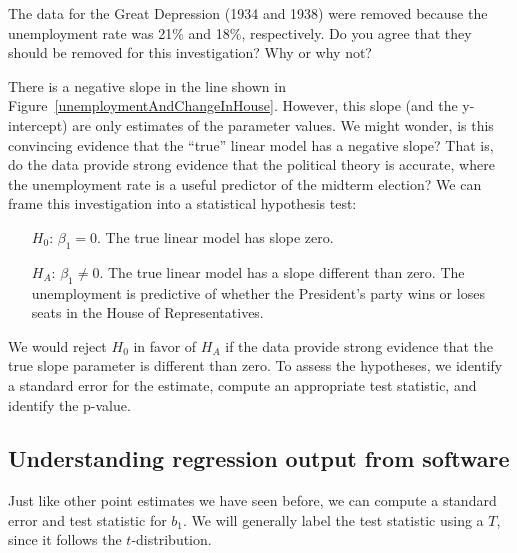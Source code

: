 \begin{exercisewrap}
\begin{nexercise}
The data for the Great Depression (1934 and 1938) were removed
because the unemployment rate was 21\% and 18\%, respectively.
Do you agree that they should be removed for this investigation?
Why or why not?\footnotemark{}
\end{nexercise}
\end{exercisewrap}

There is a negative slope in the line shown in
Figure~\ref{unemploymentAndChangeInHouse}.
However, this slope (and the y-intercept) are only estimates
of the parameter values.
We might wonder, is this convincing evidence that the ``true''
linear model has a negative slope?
That is, do the data provide strong evidence that the political
theory is accurate, where the unemployment rate is a useful
predictor of the midterm election?
We can frame this investigation into a statistical hypothesis
test:
\begin{itemize}
\item[$H_0$:]
    $\beta_1 = 0$.
    The true linear model has slope zero.
\item[$H_A$:]
    $\beta_1 \neq 0$.
    The true linear model has a slope different than zero.
    The unemployment is predictive of whether the President's
    party wins or loses seats in the House of Representatives.
\end{itemize}
We would reject $H_0$ in favor of $H_A$ if the data provide
strong evidence that the true slope parameter is different
than zero.
To assess the hypotheses, we identify a standard error
for the estimate, compute an appropriate test statistic,
and identify the p-value.


\subsection{Understanding regression output from software}
\label{testStatisticForTheSlope}

\newcommand{\midtermshouseDF}{27}

Just like other point estimates we have seen before,
we can compute a standard error and test statistic for $b_1$.
We will generally label the test statistic using a $T$,
since it follows the $t$-distribution.

